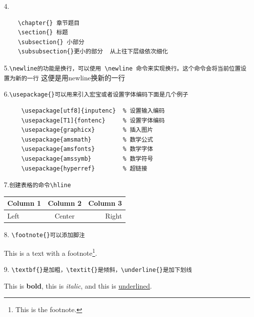 \documentclass{article}
\begin{document}
4.\begin{verbatim}
    \chapter{} 章节题目
    \section{} 标题
    \subsection{} 小部分
    \subsubsection{}更小的部分  从上往下层级依次细化
    \end{verbatim}

5.\verb|\newline的功能是换行，可以使用 \newline 命令来实现换行。这个命令会将当前位置设置为新的一行|
这便是用newline换新的一行\newline

6.\verb|\usepackage{}可以用来引入宏宝或者设置字体编码下面是几个例子|\begin{verbatim}
     \usepackage[utf8]{inputenc}  % 设置输入编码
     \usepackage[T1]{fontenc}     % 设置字体编码
     \usepackage{graphicx}        % 插入图片
     \usepackage{amsmath}         % 数学公式
     \usepackage{amsfonts}        % 数学字体
     \usepackage{amssymb}         % 数学符号
     \usepackage{hyperref}        % 超链接
\end{verbatim}

7.\verb|创建表格的命令\hline|

\begin{tabular}{|l|c|r|}
  \hline
  Column 1 & Column 2 & Column 3 \\
  \hline
  Left & Center & Right \\
  \hline
\end{tabular}
\newline

8.
\verb|\footnote{}可以添加脚注|

This is a text with a footnote\footnote{This is the footnote.}.

9.
\verb|\textbf{}是加粗，\textit{}是倾斜，\underline{}是加下划线|

This is \textbf{bold}, this is \textit{italic}, and this is \underline{underlined}.
\end{document}
